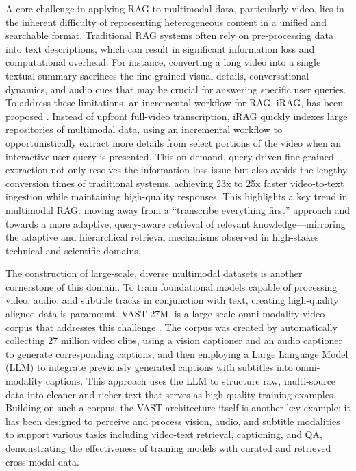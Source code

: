 \documentclass[11pt]{article}
\begin{document}
A core challenge in applying RAG to multimodal data, particularly video, lies in the inherent difficulty of representing heterogeneous content in a unified and searchable format. Traditional RAG systems often rely on pre-processing data into text descriptions, which can result in significant information loss and computational overhead. For instance, converting a long video into a single textual summary sacrifices the fine-grained visual details, conversational dynamics, and audio cues that may be crucial for answering specific user queries. To address these limitations, an incremental workflow for RAG, iRAG, has been proposed \cite{ref194}. Instead of upfront full-video transcription, iRAG quickly indexes large repositories of multimodal data, using an incremental workflow to opportunistically extract more details from select portions of the video when an interactive user query is presented. This on-demand, query-driven fine-grained extraction not only resolves the information loss issue but also avoids the lengthy conversion times of traditional systems, achieving 23x to 25x faster video-to-text ingestion while maintaining high-quality responses. This highlights a key trend in multimodal RAG: moving away from a ``transcribe everything first'' approach and towards a more adaptive, query-aware retrieval of relevant knowledge---mirroring the adaptive and hierarchical retrieval mechanisms observed in high-stakes technical and scientific domains.

The construction of large-scale, diverse multimodal datasets is another cornerstone of this domain. To train foundational models capable of processing video, audio, and subtitle tracks in conjunction with text, creating high-quality aligned data is paramount. VAST-27M, is a large-scale omni-modality video corpus that addresses this challenge \cite{ref195}. The corpus was created by automatically collecting 27 million video clips, using a vision captioner and an audio captioner to generate corresponding captions, and then employing a Large Language Model (LLM) to integrate previously generated captions with subtitles into omni-modality captions. This approach uses the LLM to structure raw, multi-source data into cleaner and richer text that serves as high-quality training examples. Building on such a corpus, the VAST architecture itself is another key example; it has been designed to perceive and process vision, audio, and subtitle modalities to support various tasks including video-text retrieval, captioning, and QA, demonstrating the effectiveness of training models with curated and retrieved cross-modal data.
\end{document}
